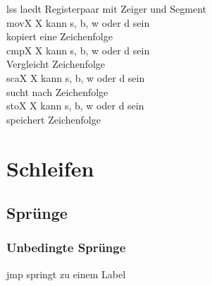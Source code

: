 \documentclass[a4paper,12pt,twoside]{article}
\begin{document}
\begin{tabbing}
  \> lss \> laedt Registerpaar mit Zeiger und Segment \\ 
  \> movX \> X kann s, b, w oder d sein \\ 
  \> \> kopiert eine Zeichenfolge \\
  \> cmpX \> X kann s, b, w oder d sein \\
  \> \> Vergleicht Zeichenfolge \\
  \> scaX \> X kann s, b, w oder d sein \\ 
  \> \> sucht nach Zeichenfolge \\ 
  \> stoX \> X kann s, b, w oder d sein \\ 
  \> \> speichert Zeichenfolge \\
\end{tabbing}
\section{Schleifen}
\subsection{Sprünge}
\subsubsection{Unbedingte Sprünge}
\hspace{2mm} jmp \hspace{50mm} springt zu einem Label \\
\end{document}
